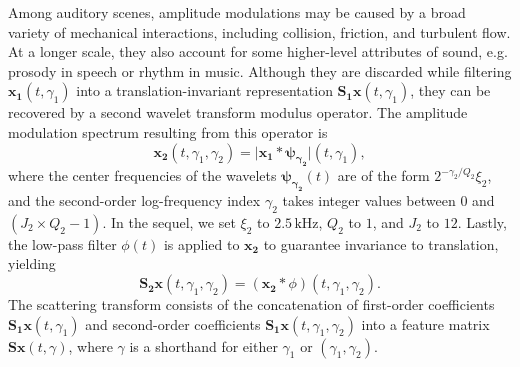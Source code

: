 \documentclass[journal]{IEEEtran}
\makeatletter
\newcommand*{\eg}{e.g.\@\xspace}
\makeatother
\begin{document}
Among auditory scenes, amplitude modulations may be caused by a broad variety of mechanical interactions, including collision, friction, and turbulent flow.
At a longer scale, they also account for some higher-level attributes of sound, \eg prosody in speech or rhythm in music.
Although they are discarded while filtering $\boldsymbol{x_1}(t,\gamma_1)$ into a translation-invariant representation $\mathbf{S_1}\boldsymbol{x}(t,\gamma_1)$, they can be recovered by a second wavelet transform modulus operator.
The amplitude modulation spectrum resulting from this operator is
\begin{equation}
\boldsymbol{x_2}(t,\gamma_1,\gamma_2) =
\vert \boldsymbol{x_1} \ast \boldsymbol{\psi_{\gamma_2}} \vert(t,\gamma_1),
\end{equation}
where the center frequencies of the wavelets $\boldsymbol{\psi_{\gamma_2}}(t)$ are of the form $2^{-\gamma_2/Q_2} \xi_2$, and the second-order log-frequency index $\gamma_2$ takes integer values between $0$ and $(J_2 \times Q_2 - 1)$.
In the sequel, we set $\xi_2$ to $2.5\,\mathrm{kHz}$, $Q_2$ to $1$, and $J_2$ to $12$. Lastly, the low-pass filter $\phi(t)$ is applied to $\boldsymbol{x_2}$ to guarantee invariance to translation, yielding
\begin{equation}
\mathbf{S_2}\boldsymbol{x}(t,\gamma_1,\gamma_2) =
(\boldsymbol{x_2} \ast \phi)(t,\gamma_1,\gamma_2).
\end{equation}
The scattering transform consists of the concatenation of first-order coefficients $\mathbf{S_1}\boldsymbol{x}(t,\gamma_1)$ and second-order coefficients $\mathbf{S_1}\boldsymbol{x}(t,\gamma_1,\gamma_2)$ into a feature matrix $\mathbf{S}\boldsymbol{x}(t,\gamma)$, where $\gamma$ is a shorthand for either $\gamma_1$ or $(\gamma_1,\gamma_2)$.

\end{document}
